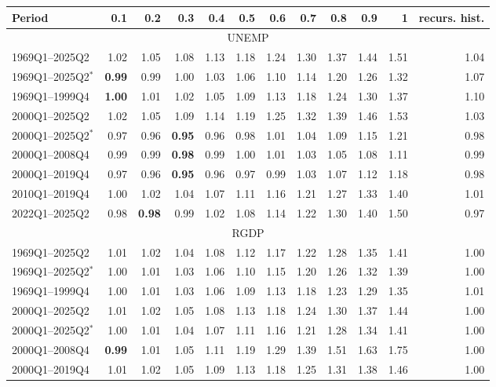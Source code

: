 \begin{tabular}{lrrrrrrrrrrr}
\hline
Period & 0.1 & 0.2 & 0.3 & 0.4 & 0.5 & 0.6 & 0.7 & 0.8 & 0.9 & 1 & recurs. hist. \\
\hline
\multicolumn{12}{c}{UNEMP} \\
1969Q1--2025Q2 & 1.02 & 1.05 & 1.08 & 1.13 & 1.18 & 1.24 & 1.30 & 1.37 & 1.44 & 1.51 & 1.04 \\
1969Q1--2025Q2$^*$ & \textbf{0.99} & 0.99 & 1.00 & 1.03 & 1.06 & 1.10 & 1.14 & 1.20 & 1.26 & 1.32 & 1.07 \\
1969Q1--1999Q4 & \textbf{1.00} & 1.01 & 1.02 & 1.05 & 1.09 & 1.13 & 1.18 & 1.24 & 1.30 & 1.37 & 1.10 \\
2000Q1--2025Q2 & 1.02 & 1.05 & 1.09 & 1.14 & 1.19 & 1.25 & 1.32 & 1.39 & 1.46 & 1.53 & 1.03 \\
2000Q1--2025Q2$^*$ & 0.97 & 0.96 & \textbf{0.95} & 0.96 & 0.98 & 1.01 & 1.04 & 1.09 & 1.15 & 1.21 & 0.98 \\
2000Q1--2008Q4 & 0.99 & 0.99 & \textbf{0.98} & 0.99 & 1.00 & 1.01 & 1.03 & 1.05 & 1.08 & 1.11 & 0.99 \\
2000Q1--2019Q4 & 0.97 & 0.96 & \textbf{0.95} & 0.96 & 0.97 & 0.99 & 1.03 & 1.07 & 1.12 & 1.18 & 0.98 \\
2010Q1--2019Q4 & 1.00 & 1.02 & 1.04 & 1.07 & 1.11 & 1.16 & 1.21 & 1.27 & 1.33 & 1.40 & 1.01 \\
2022Q1--2025Q2 & 0.98 & \textbf{0.98} & 0.99 & 1.02 & 1.08 & 1.14 & 1.22 & 1.30 & 1.40 & 1.50 & 0.97 \\
\hline
\multicolumn{12}{c}{RGDP} \\
1969Q1--2025Q2 & 1.01 & 1.02 & 1.04 & 1.08 & 1.12 & 1.17 & 1.22 & 1.28 & 1.35 & 1.41 & 1.00 \\
1969Q1--2025Q2$^*$ & 1.00 & 1.01 & 1.03 & 1.06 & 1.10 & 1.15 & 1.20 & 1.26 & 1.32 & 1.39 & 1.00 \\
1969Q1--1999Q4 & 1.00 & 1.01 & 1.03 & 1.06 & 1.09 & 1.13 & 1.18 & 1.23 & 1.29 & 1.35 & 1.01 \\
2000Q1--2025Q2 & 1.01 & 1.02 & 1.05 & 1.08 & 1.13 & 1.18 & 1.24 & 1.30 & 1.37 & 1.44 & 1.00 \\
2000Q1--2025Q2$^*$ & 1.00 & 1.01 & 1.04 & 1.07 & 1.11 & 1.16 & 1.21 & 1.28 & 1.34 & 1.41 & 1.00 \\
2000Q1--2008Q4 & \textbf{0.99} & 1.01 & 1.05 & 1.11 & 1.19 & 1.29 & 1.39 & 1.51 & 1.63 & 1.75 & 1.00 \\
2000Q1--2019Q4 & 1.01 & 1.02 & 1.05 & 1.09 & 1.13 & 1.18 & 1.25 & 1.31 & 1.38 & 1.46 & 1.00 \\

\end{tabular}
